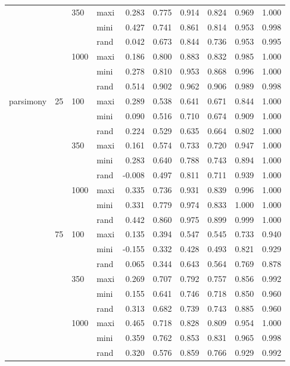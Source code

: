 \begin{longtable}{llllrrrrrr}
   &  & 350 & maxi & 0.283 & 0.775 & 0.914 & 0.824 & 0.969 & 1.000 \\ 
   &  &  & mini & 0.427 & 0.741 & 0.861 & 0.814 & 0.953 & 0.998 \\ 
   &  &  & rand & 0.042 & 0.673 & 0.844 & 0.736 & 0.953 & 0.995 \\ 
   &  & 1000 & maxi & 0.186 & 0.800 & 0.883 & 0.832 & 0.985 & 1.000 \\ 
   &  &  & mini & 0.278 & 0.810 & 0.953 & 0.868 & 0.996 & 1.000 \\ 
   &  &  & rand & 0.514 & 0.902 & 0.962 & 0.906 & 0.989 & 0.998 \\ 
  parsimony & 25 & 100 & maxi & 0.289 & 0.538 & 0.641 & 0.671 & 0.844 & 1.000 \\ 
   &  &  & mini & 0.090 & 0.516 & 0.710 & 0.674 & 0.909 & 1.000 \\ 
   &  &  & rand & 0.224 & 0.529 & 0.635 & 0.664 & 0.802 & 1.000 \\ 
   &  & 350 & maxi & 0.161 & 0.574 & 0.733 & 0.720 & 0.947 & 1.000 \\ 
   &  &  & mini & 0.283 & 0.640 & 0.788 & 0.743 & 0.894 & 1.000 \\ 
   &  &  & rand & -0.008 & 0.497 & 0.811 & 0.711 & 0.939 & 1.000 \\ 
   &  & 1000 & maxi & 0.335 & 0.736 & 0.931 & 0.839 & 0.996 & 1.000 \\ 
   &  &  & mini & 0.331 & 0.779 & 0.974 & 0.833 & 1.000 & 1.000 \\ 
   &  &  & rand & 0.442 & 0.860 & 0.975 & 0.899 & 0.999 & 1.000 \\ 
   & 75 & 100 & maxi & 0.135 & 0.394 & 0.547 & 0.545 & 0.733 & 0.940 \\ 
   &  &  & mini & -0.155 & 0.332 & 0.428 & 0.493 & 0.821 & 0.929 \\ 
   &  &  & rand & 0.065 & 0.344 & 0.643 & 0.564 & 0.769 & 0.878 \\ 
   &  & 350 & maxi & 0.269 & 0.707 & 0.792 & 0.757 & 0.856 & 0.992 \\ 
   &  &  & mini & 0.155 & 0.641 & 0.746 & 0.718 & 0.850 & 0.960 \\ 
   &  &  & rand & 0.313 & 0.682 & 0.739 & 0.743 & 0.885 & 0.960 \\ 
   &  & 1000 & maxi & 0.465 & 0.718 & 0.828 & 0.809 & 0.954 & 1.000 \\ 
   &  &  & mini & 0.359 & 0.762 & 0.853 & 0.831 & 0.965 & 0.998 \\ 
   &  &  & rand & 0.320 & 0.576 & 0.859 & 0.766 & 0.929 & 0.992 \\ 

\end{longtable}
